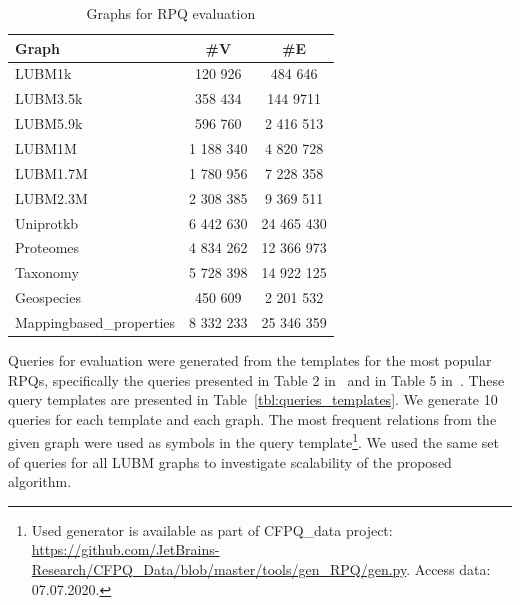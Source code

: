 \begin{table}
    \centering
\caption{Graphs for RPQ evaluation}
\label{tbl:graphs_for_rpq}
{

\begin{tabular}{|l|c|c|}
\hline
Graph & \#V & \#E  \\
\hline
\hline
LUBM1k  & 120 926 & 484 646 \\
LUBM3.5k  & 358 434 & 144 9711 \\
LUBM5.9k  & 596 760 & 2 416 513 \\
LUBM1M   & 1 188 340 & 4 820 728 \\
LUBM1.7M & 1 780 956 & 7 228 358 \\
LUBM2.3M & 2 308 385 & 9 369 511 \\
\hline
Uniprotkb & 6 442 630 & 24 465 430 \\
Proteomes & 4 834 262 & 12 366 973 \\
Taxonomy & 5 728 398 & 14 922 125 \\
\hline
Geospecies & 450 609 & 2 201 532 \\
Mappingbased\_properties & 8 332 233 & 25 346 359 \\
\hline
\end{tabular}
}
\end{table}


Queries for evaluation were generated from the templates for the most popular RPQs, specifically the queries presented in Table 2 in~\cite{Pacaci2020RegularPQ} and in Table 5 in~\cite{Wang2019}.
These query templates are presented in Table~\ref{tbl:queries_templates}.
We generate 10 queries for each template and each graph.
The most frequent relations from the given graph were used as symbols in the query template\footnote{Used generator is available as part of CFPQ\_data project: \url{https://github.com/JetBrains-Research/CFPQ_Data/blob/master/tools/gen_RPQ/gen.py}. Access data: 07.07.2020.}.
We used the same set of queries for all LUBM graphs to investigate scalability of the proposed algorithm.

